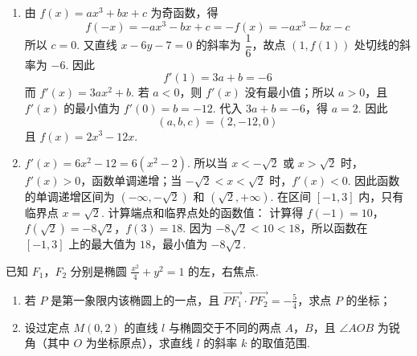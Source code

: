 \begin{solution}
\begin{enumerate}
\item 由 \(f(x)=ax^{3}+bx+c\) 为奇函数，得
\[
f(-x)=-ax^{3}-bx+c=-f(x)=-ax^{3}-bx-c
\]
所以 \(c=0\). 又直线 \(x-6y-7=0\) 的斜率为 \(\dfrac16\)，故点 \((1,f(1))\) 处切线的斜率为 \(-6\). 因此
\[
f'(1)=3a+b=-6
\]
而 \(f'(x)=3ax^{2}+b\). 若 \(a<0\)，则 \(f'(x)\) 没有最小值；所以 \(a>0\)，且 \(f'(x)\) 的最小值为 \(f'(0)=b=-12\). 代入 \(3a+b=-6\)，得 \(a=2\). 因此
\[
(a,b,c)=(2,-12,0)
\]
且 \(f(x)=2x^{3}-12x\).
\item \(f'(x)=6x^{2}-12=6(x^{2}-2)\). 所以当 \(x<-\sqrt2\) 或 \(x>\sqrt2\) 时，\(f'(x)>0\)，函数单调递增；当 \(-\sqrt2<x<\sqrt2\) 时，\(f'(x)<0\). 因此函数的单调递增区间为 \((-\infty,-\sqrt2)\) 和 \((\sqrt2,+\infty)\). 在区间 \([-1,3]\) 内，只有临界点 \(x=\sqrt2\). 计算端点和临界点处的函数值：
计算得 \(f(-1)=10\)，\(f(\sqrt2)=-8\sqrt2\)，\(f(3)=18\). 因为 \(-8\sqrt2<10<18\)，所以函数在 \([-1,3]\) 上的最大值为 \(18\)，最小值为 \(-8\sqrt2\).
\end{enumerate}
\end{solution}

\begin{problem}
已知 \(F_{1}\)，\(F_{2}\) 分别是椭圆 \(\frac{x^{2}}{4} + y^{2} = 1\) 的左，右焦点.
\begin{enumerate}
\item 若 \(P\) 是第一象限内该椭圆上的一点，且 \(\overrightarrow{PF_{1}} \cdot \overrightarrow{PF_{2}} = -\frac{5}{4}\)，求点 \(P\) 的坐标；
\item 设过定点 \(M(0,2)\) 的直线 \(l\) 与椭圆交于不同的两点 \(A\)，\(B\)，且 \(\angle AOB\) 为锐角（其中 \(O\) 为坐标原点），求直线 \(l\) 的斜率 \(k\) 的取值范围.
\end{enumerate}

\end{problem}


